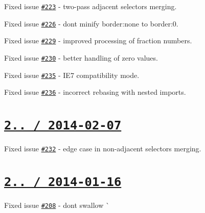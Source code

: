 \begin{DoxyItemize}
\item Fixed issue \href{https://github.com/jakubpawlowicz/clean-css/issues/223}{\tt \#223} -\/ two-\/pass adjacent selectors merging.
\item Fixed issue \href{https://github.com/jakubpawlowicz/clean-css/issues/226}{\tt \#226} -\/ don\textquotesingle{}t minify {\ttfamily border\+:none} to {\ttfamily border\+:0}.
\item Fixed issue \href{https://github.com/jakubpawlowicz/clean-css/issues/229}{\tt \#229} -\/ improved processing of fraction numbers.
\item Fixed issue \href{https://github.com/jakubpawlowicz/clean-css/issues/230}{\tt \#230} -\/ better handling of zero values.
\item Fixed issue \href{https://github.com/jakubpawlowicz/clean-css/issues/235}{\tt \#235} -\/ I\+E7 compatibility mode.
\item Fixed issue \href{https://github.com/jakubpawlowicz/clean-css/issues/236}{\tt \#236} -\/ incorrect rebasing with nested {\ttfamily import}s.
\end{DoxyItemize}

\section*{\href{https://github.com/jakubpawlowicz/clean-css/compare/v2.0.7...v2.0.8}{\tt 2.. / 2014-\/02-\/07} }


\begin{DoxyItemize}
\item Fixed issue \href{https://github.com/jakubpawlowicz/clean-css/issues/232}{\tt \#232} -\/ edge case in non-\/adjacent selectors merging.
\end{DoxyItemize}

\section*{\href{https://github.com/jakubpawlowicz/clean-css/compare/v2.0.6...v2.0.7}{\tt 2.. / 2014-\/01-\/16} }


\begin{DoxyItemize}
\item Fixed issue \href{https://github.com/jakubpawlowicz/clean-css/issues/208}{\tt \#208} -\/ don\textquotesingle{}t swallow \`{} 
\end{DoxyItemize}